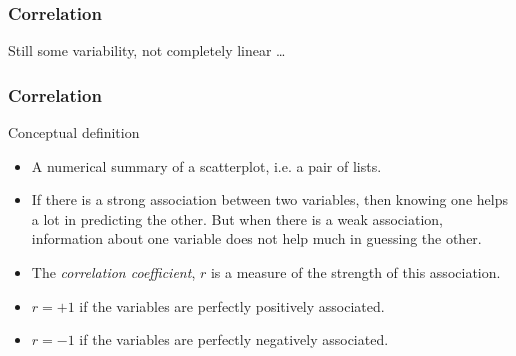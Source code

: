 \documentclass[handout]{beamer}
\begin{document}


   \begin{frame}
   \frametitle{Correlation}
   \begin{center}
   \end{center}
   Still some variability, not completely linear \dots
   \end{frame}


   \begin{frame} \frametitle{Correlation}

   \begin{block}
   {Conceptual definition}

   \begin{itemize}
   \item A numerical summary of a scatterplot, i.e. a pair of lists.

   \item    If there is a strong association between two variables, then
   knowing one helps a lot in predicting the other. But when
   there is a weak association, information about one variable
   does not help much in guessing the other.

   \item The {\em correlation coefficient}, $r$ is a measure of the strength of this association.

   \item $r=+1$ if the variables are perfectly positively associated.

   \item $r=-1$ if the variables are perfectly negatively associated.
   \end{itemize}



   \end{block}
   \end{frame}
\end{document}
